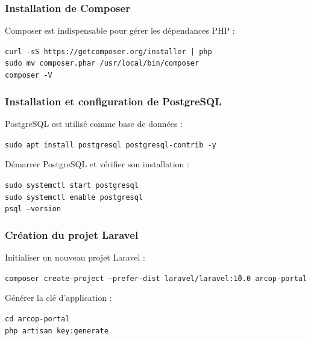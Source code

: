 \subsubsection*{Installation de Composer}
Composer est indispensable pour gérer les dépendances PHP :

\begin{tcolorbox}[colback=black, coltext=white, title=Installation de Composer, fonttitle=\bfseries]
\texttt{curl -sS https://getcomposer.org/installer | php} \\
\texttt{sudo mv composer.phar /usr/local/bin/composer} \\
\texttt{composer -V}
\end{tcolorbox}

\subsubsection*{Installation et configuration de PostgreSQL}
PostgreSQL est utilisé comme base de données :

\begin{tcolorbox}[colback=black, coltext=white, title=Installation de PostgreSQL, fonttitle=\bfseries]
\texttt{sudo apt install postgresql postgresql-contrib -y}
\end{tcolorbox}

Démarrer PostgreSQL et vérifier son installation :

\begin{tcolorbox}[colback=black, coltext=white, title=Démarrage et vérification, fonttitle=\bfseries]
\texttt{sudo systemctl start postgresql} \\
\texttt{sudo systemctl enable postgresql} \\
\texttt{psql --version}
\end{tcolorbox}

\subsubsection*{Création du projet Laravel}
Initialiser un nouveau projet Laravel :

\begin{tcolorbox}[colback=black, coltext=white, title=Création du projet Laravel, fonttitle=\bfseries]
\texttt{composer create-project --prefer-dist laravel/laravel:\^10.0 arcop-portal}
\end{tcolorbox}

Générer la clé d'application :

\begin{tcolorbox}[colback=black, coltext=white, title=Génération de la clé d'application, fonttitle=\bfseries]
\texttt{cd arcop-portal} \\
\texttt{php artisan key:generate}
\end{tcolorbox}

